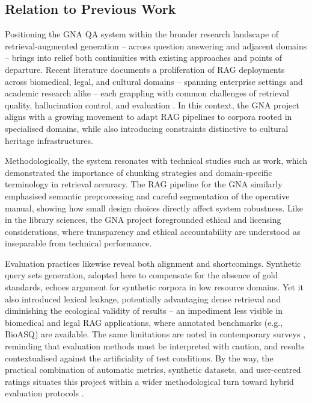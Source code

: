 \begin{spacing}{1.5}
\section{Relation to Previous Work}
Positioning the GNA QA system within the broader research landscape of retrieval-augmented generation -- across question answering and adjacent domains -- brings into relief both continuities with existing approaches and points of departure. Recent literature documents a proliferation of RAG deployments across biomedical, legal, and cultural domains -- spanning enterprise settings and academic research alike -- each grappling with common challenges of retrieval quality, hallucination control, and evaluation \citep{agarwal_litllm_2025,bevara_prospects_2025,soman_observations_2024}. In this context, the GNA project aligns with a growing movement to adapt RAG pipelines to corpora rooted in specialised domains, while also introducing constraints distinctive to cultural heritage infrastructures.

Methodologically, the system resonates with technical studies such as \citet{soman_observations_2024} work, which demonstrated the importance of chunking strategies and domain-specific terminology in retrieval accuracy. The RAG pipeline for the GNA similarly emphasised semantic preprocessing and careful segmentation of the operative manual, showing how small design choices directly affect system robustness. Like \citet{bevara_prospects_2025} in the library sciences, the GNA project foregrounded ethical and licensing considerations, where transparency and ethical accountability are understood as inseparable from technical performance.

Evaluation practices likewise reveal both alignment and shortcomings. Synthetic query sets generation, adopted here to compensate for the absence of gold standards, echoes \citet{bor-woei_generative_2024} argument for synthetic corpora in low resource domains. Yet it also introduced lexical leakage, potentially advantaging dense retrieval and diminishing the ecological validity of results -- an impediment less visible in biomedical and legal RAG applications, where annotated benchmarks (e.g., BioASQ) are available. The same limitations are noted in contemporary surveys \citep{yue_survey_2025}, reminding that evaluation methods must be interpreted with caution, and results contextualised against the artificiality of test conditions. By the way, the practical combination of automatic metrics, synthetic datasets, and user-centred ratings situates this project within a wider methodological turn toward hybrid evaluation protocols \citep{abeysinghe_challenges_2024,gupta_comprehensive_2024}.


\end{spacing}
